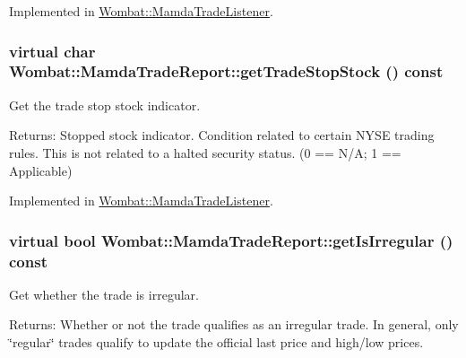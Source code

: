 Implemented in \hyperlink{classWombat_1_1MamdaTradeListener_719ed8fafd8f299b274ba2f11981b3ba}{Wombat::Mamda\-Trade\-Listener}.\hypertarget{classWombat_1_1MamdaTradeReport_5e97df5f0d331db50a07db5ebf9336da}{
\subsubsection[getTradeStopStock]{\setlength{\rightskip}{0pt plus 5cm}virtual char Wombat::Mamda\-Trade\-Report::get\-Trade\-Stop\-Stock () const}}
\label{classWombat_1_1MamdaTradeReport_5e97df5f0d331db50a07db5ebf9336da}


Get the trade stop stock indicator. 

\begin{Desc}
\item[Returns:]Stopped stock indicator. Condition related to certain NYSE trading rules. This is not related to a halted security status. (0 == N/A; 1 == Applicable) \end{Desc}


Implemented in \hyperlink{classWombat_1_1MamdaTradeListener_2d4333ba424d00cbda5e88a846ef3c8c}{Wombat::Mamda\-Trade\-Listener}.\hypertarget{classWombat_1_1MamdaTradeReport_ae1e4952c9fb7450300864c44c715637}{
\subsubsection[getIsIrregular]{\setlength{\rightskip}{0pt plus 5cm}virtual bool Wombat::Mamda\-Trade\-Report::get\-Is\-Irregular () const}}
\label{classWombat_1_1MamdaTradeReport_ae1e4952c9fb7450300864c44c715637}


Get whether the trade is irregular. 

\begin{Desc}
\item[Returns:]Whether or not the trade qualifies as an irregular trade. In general, only \char`\"{}regular\char`\"{} trades qualify to update the official last price and high/low prices. \end{Desc}


